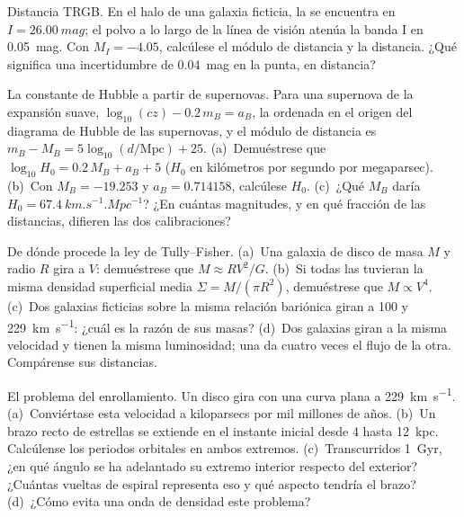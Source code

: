 \begin{exercise}[$\star\star$]\label{exo:b3:milky-way-galaxies:8}
Distancia TRGB. En el halo de una galaxia ficticia, la 
se encuentra en $I = \qty{26.00}{mag}$; el polvo a lo largo de la línea de
visión atenúa la banda I en \qty{0.05}{mag}. Con $M_I = -4.05$, calcúlese el
módulo de distancia y la distancia. ¿Qué significa una incertidumbre de
\qty{0.04}{mag} en la punta, en distancia?
\end{exercise}

\begin{exercise}[$\star\star$]\label{exo:b3:milky-way-galaxies:9}
La constante de Hubble a partir de supernovas. Para una supernova de la expansión suave,
$\log_{10}(cz) - 0.2\,m_B = a_B$, la ordenada en el origen del
diagrama de Hubble de las supernovas, y el módulo de distancia es
$m_B - M_B = 5\log_{10}(d/\mathrm{Mpc}) + 25$. (a)~Demuéstrese que
$\log_{10}H_0 = 0.2\,M_B + a_B + 5$ ($H_0$ en kilómetros por segundo por
megaparsec). (b)~Con $M_B = -19.253$ y $a_B = 0.714158$, calcúlese $H_0$.
(c)~¿Qué $M_B$ daría $H_0 = \qty{67.4}{km.s^{-1}.Mpc^{-1}}$? ¿En cuántas
magnitudes, y en qué fracción de las distancias, difieren las dos
calibraciones?
\end{exercise}

\begin{exercise}[$\star\star\star$]\label{exo:b3:milky-way-galaxies:10}
De dónde procede la ley de Tully--Fisher. (a)~Una galaxia de disco de masa $M$
y radio $R$ gira a $V$: demuéstrese que $M \approx RV^2/G$. (b)~Si todas
las  tuvieran la misma densidad superficial media $\Sigma = M/(\pi R^2)$,
demuéstrese que $M \propto V^4$. (c)~Dos galaxias ficticias sobre la misma relación bariónica
giran a 100 y \qty{229}{km.s^{-1}}: ¿cuál es la razón de
sus masas? (d)~Dos galaxias giran a la misma velocidad y tienen la misma
luminosidad; una da cuatro veces el flujo de la otra. Compárense sus
distancias.
\end{exercise}

\begin{exercise}[$\star\star\star$]\label{exo:b3:milky-way-galaxies:11}
El problema del enrollamiento. Un disco gira con una curva plana a
\qty{229}{km.s^{-1}}. (a)~Conviértase esta velocidad a kiloparsecs por mil millones de
años. (b)~Un brazo recto de estrellas se extiende en el instante inicial desde 4 hasta
\qty{12}{kpc}. Calcúlense los periodos orbitales en ambos extremos. (c)~Transcurridos
\qty{1}{Gyr}, ¿en qué ángulo se ha adelantado su extremo interior respecto del exterior?
¿Cuántas vueltas de espiral representa eso y qué aspecto tendría el
brazo? (d)~¿Cómo evita una onda de densidad este problema?
\end{exercise}

